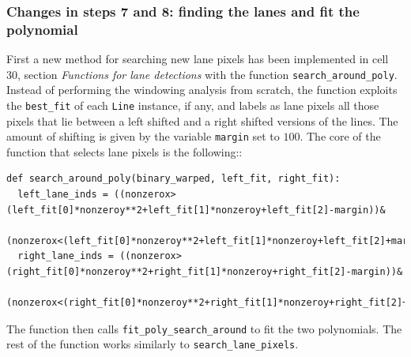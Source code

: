 \documentclass{article}
\let\cd\lstinline
\begin{document}
\subsubsection{Changes in steps 7 and 8: finding the lanes and fit the polynomial }
First a new method for searching new lane pixels has been implemented in cell 30, section \textit{Functions for lane detections} with the function \cd+search_around_poly+. Instead of performing the windowing analysis from scratch, the function exploits the \cd+best_fit+ of each \cd+Line+ instance, if any, and labels as lane pixels all those pixels that lie between a left shifted  and a right shifted versions of the lines. The amount of shifting is given by the variable \cd+margin+ set to $100$.
The core of the function that selects lane pixels is the following::
\begin{lstlisting}
def search_around_poly(binary_warped, left_fit, right_fit):
  left_lane_inds = ((nonzerox>(left_fit[0]*nonzeroy**2+left_fit[1]*nonzeroy+left_fit[2]-margin))&
    (nonzerox<(left_fit[0]*nonzeroy**2+left_fit[1]*nonzeroy+left_fit[2]+margin)))
  right_lane_inds = ((nonzerox>(right_fit[0]*nonzeroy**2+right_fit[1]*nonzeroy+right_fit[2]-margin))&
    (nonzerox<(right_fit[0]*nonzeroy**2+right_fit[1]*nonzeroy+right_fit[2]+margin)))
\end{lstlisting}
The function then calls \cd+fit_poly_search_around+ to fit the two polynomials. The rest of the function works similarly to \cd+search_lane_pixels+.
\end{document}
